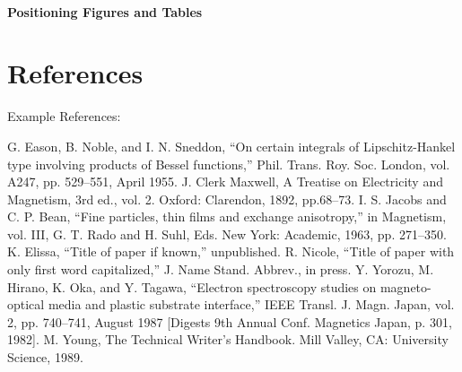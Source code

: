 \documentclass[conference]{IEEEtran}
\begin{document}
\paragraph{Positioning Figures and Tables}




\section*{References}
Example References:
\begin{thebibliography}{00}
 G. Eason, B. Noble, and I. N. Sneddon, ``On certain integrals of Lipschitz-Hankel type involving products of Bessel functions,'' Phil. Trans. Roy. Soc. London, vol. A247, pp. 529--551, April 1955.
 J. Clerk Maxwell, A Treatise on Electricity and Magnetism, 3rd ed., vol. 2. Oxford: Clarendon, 1892, pp.68--73.
 I. S. Jacobs and C. P. Bean, ``Fine particles, thin films and exchange anisotropy,'' in Magnetism, vol. III, G. T. Rado and H. Suhl, Eds. New York: Academic, 1963, pp. 271--350.
 K. Elissa, ``Title of paper if known,'' unpublished.
 R. Nicole, ``Title of paper with only first word capitalized,'' J. Name Stand. Abbrev., in press.
 Y. Yorozu, M. Hirano, K. Oka, and Y. Tagawa, ``Electron spectroscopy studies on magneto-optical media and plastic substrate interface,'' IEEE Transl. J. Magn. Japan, vol. 2, pp. 740--741, August 1987 [Digests 9th Annual Conf. Magnetics Japan, p. 301, 1982].
 M. Young, The Technical Writer's Handbook. Mill Valley, CA: University Science, 1989.
\end{thebibliography}
\end{document}

